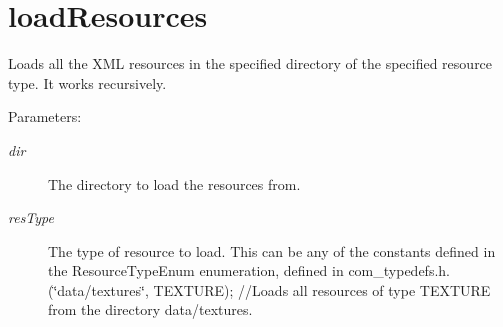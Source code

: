 \section{loadResources}
Loads all the XML resources in the specified directory of the specified resource type. It works recursively. \begin{Desc}
\item[Parameters:]
\begin{description}
\item[{\em dir}]The directory to load the resources from. \item[{\em resType}]The type of resource to load. This can be any of the constants defined in the ResourceTypeEnum enumeration, defined in com\_\-typedefs.h. (\char`\"{}data/textures\char`\"{}, TEXTURE); //Loads all resources of type TEXTURE from the directory data/textures.\end{description}
\end{Desc}


\begin{DocInclude}\begin{verbatim}\end{verbatim}
\end{DocInclude}
 